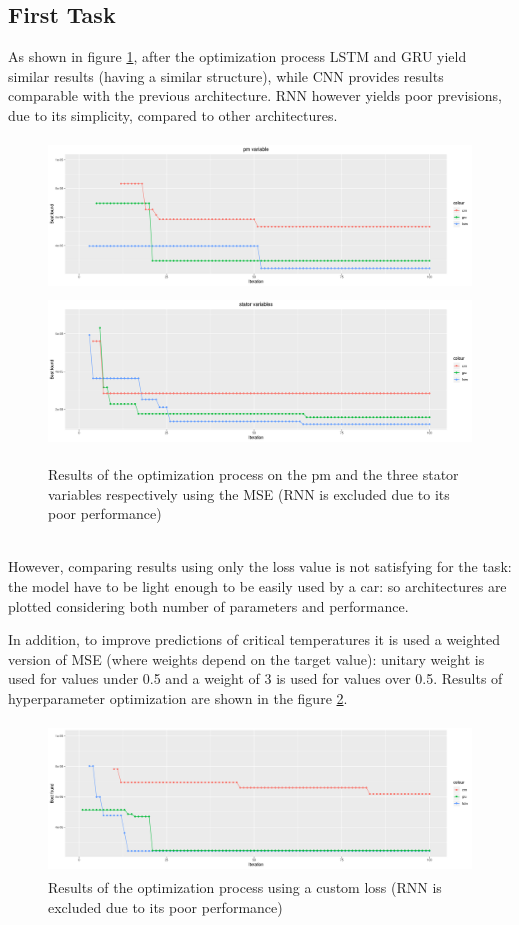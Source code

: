 \subsection{First Task}
As shown in figure \ref{fig:automl_mse}, after the optimization process LSTM and GRU yield similar results (having a similar structure), while CNN provides results comparable with the previous architecture.
RNN however yields poor previsions, due to its simplicity, compared to other architectures.
\begin{figure}[!h]
    \centering
    \includegraphics[width=\linewidth, height=4cm]{imgs/comparison_MSE.png}
    \includegraphics[width=\linewidth, height=4cm]{imgs/comparison_MSE_stator.png}
    \caption{Results of the optimization process on the pm and the three stator variables respectively using the MSE (RNN is excluded due to its poor performance)}
    \label{fig:automl_mse}
\end{figure}\\

However, comparing results using only the loss value is not satisfying for the task: the model have to be light enough to be easily used by a car: so architectures are plotted considering both number of parameters and performance.


In addition, to improve predictions of critical temperatures it is used a weighted version of MSE (where weights depend on the target value): unitary weight is used for values under 0.5 and a weight of 3 is used for values over 0.5.
Results of hyperparameter optimization are shown in the figure \ref{fig:automl_custom}.
\begin{figure}[!h]
    \centering
    \includegraphics[width=\linewidth, height=4cm]{imgs/comparison_MSE_new_loss.png}
    \caption{Results of the optimization process using a custom loss (RNN is excluded due to its poor performance)}
    \label{fig:automl_custom}
\end{figure}\\
  
